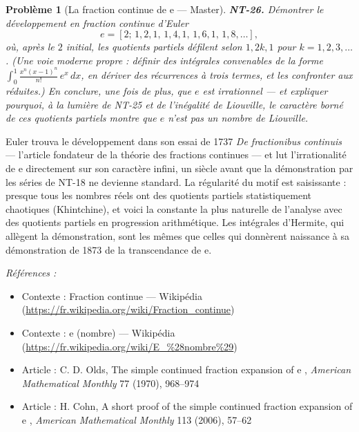 \documentclass[11pt]{article}
\newtheorem{problem}{Problème}
\newenvironment{refs}{\par\small\noindent\emph{Références :}\begin{itemize}\setlength\itemsep{0pt}}{\end{itemize}\normalsize}
\begin{document}
\bigskip

\begin{problem}[{La fraction continue de e --- Master}]
\textbf{NT-26.} Démontrer le développement en fraction continue d'Euler
\[ e = [2;\, 1, 2, 1,\, 1, 4, 1,\, 1, 6, 1,\, 1, 8, \ldots], \]
où, après le $2$ initial, les quotients partiels défilent selon $1, 2k, 1$ pour
$k = 1, 2, 3, \ldots$. (Une voie moderne propre : définir des intégrales convenables de la forme
$\int_0^1 \frac{x^n (x-1)^n}{n!}\, e^x \, dx$, en dériver des récurrences à trois termes, et les
confronter aux réduites.) En conclure, une fois de plus, que $e$ est irrationnel --- et expliquer
pourquoi, à la lumière de NT-25 et de l'inégalité de Liouville, le caractère borné de ces quotients
partiels montre que $e$ n'est \textit{pas} un nombre de Liouville.
\end{problem}

\noindent Euler trouva le développement dans son essai de 1737 \textit{De fractionibus
continuis} --- l'article fondateur de la théorie des fractions continues --- et lut l'irrationalité de
e directement sur son caractère infini, un siècle avant que la démonstration par les séries de NT-18
ne devienne standard. La régularité du motif est saisissante : presque tous les nombres réels ont des
quotients partiels statistiquement chaotiques (Khintchine), et voici la constante la plus naturelle
de l'analyse avec des quotients partiels en progression arithmétique. Les intégrales d'Hermite, qui
allègent la démonstration, sont les mêmes que celles qui donnèrent naissance à sa démonstration de
1873 de la transcendance de e.

\begin{refs}
\item Contexte : Fraction continue --- Wikipédia (\url{https://fr.wikipedia.org/wiki/Fraction_continue})
\item Contexte : e (nombre) --- Wikipédia (\url{https://fr.wikipedia.org/wiki/E_%28nombre%29})
\item Article : C. D. Olds, \og{} The simple continued fraction expansion of e \fg{}, \textit{American Mathematical Monthly} 77 (1970), 968--974
\item Article : H. Cohn, \og{} A short proof of the simple continued fraction expansion of e \fg{}, \textit{American Mathematical Monthly} 113 (2006), 57--62
\end{refs}

\bigskip
\end{document}
